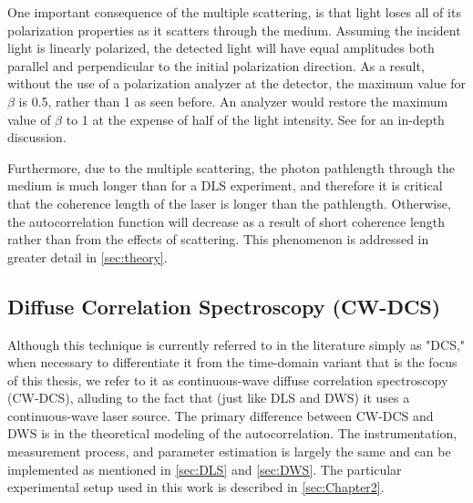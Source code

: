 One important consequence of the multiple scattering, is that light loses all of its polarization properties as it scatters through the medium. Assuming the incident light is linearly polarized, the detected light will have equal amplitudes both parallel and perpendicular to the initial polarization direction. As a result, without the use of a polarization analyzer at the detector, the maximum value for $\beta$ is 0.5, rather than 1 as seen before. An analyzer would restore the maximum value of $\beta$ to 1 at the expense of half of the light intensity. See \cite[ch. 16.3.1]{Brown1993} for an in-depth discussion.

Furthermore, due to the multiple scattering, the photon pathlength through the medium is much longer than for a DLS experiment, and therefore it is critical that the coherence length of the laser is longer than the pathlength. Otherwise, the autocorrelation function will decrease as a result of short coherence length rather than from the effects of scattering. This phenomenon is addressed in greater detail in \autoref{sec:theory}.


\subsection{Diffuse Correlation Spectroscopy (CW-DCS)} \label{sec:CW-DCS}
Although this technique is currently referred to in the literature simply as "DCS," when necessary to differentiate it from the time-domain variant that is the focus of this thesis, we refer to it as continuous-wave diffuse correlation spectroscopy (CW-DCS), alluding to the fact that (just like DLS and DWS) it uses a continuous-wave laser source. The primary difference between CW-DCS and DWS is in the theoretical modeling of the autocorrelation. The instrumentation, measurement process, and parameter estimation is largely the same and can be implemented as mentioned in \autoref{sec:DLS} and \autoref{sec:DWS}. The particular experimental setup used in this work is described in \autoref{sec:Chapter2}.

